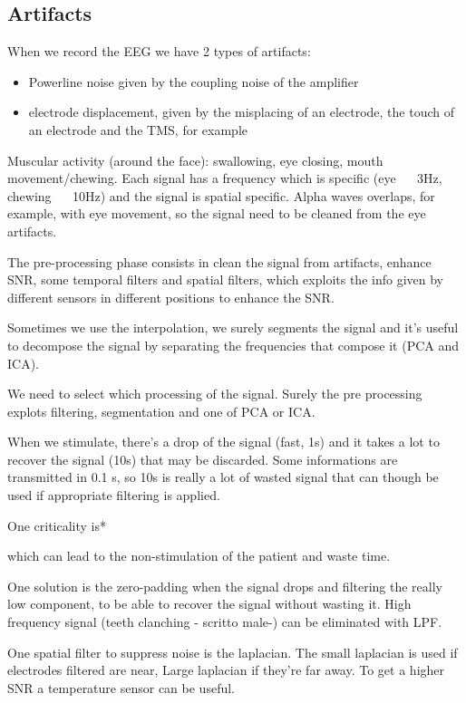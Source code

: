  \subsection{Artifacts}
 When we record the EEG we have 2 types of artifacts:
 \begin{itemize}
   \item Powerline noise given by the coupling noise of the amplifier
   \item electrode displacement, given by the misplacing of an electrode, the touch of an electrode and the TMS, for example
 \end{itemize}
 Muscular activity (around the face): swallowing, eye closing, mouth movement/chewing. Each signal has a frequency which is specific (eye ~~ 3Hz, chewing ~~ 10Hz) and the signal is spatial specific. Alpha waves overlaps, for example, with eye movement, so the signal need to be cleaned from the eye artifacts.

 The pre-processing phase consists in clean the signal from artifacts, enhance SNR, some temporal filters and spatial filters, which exploits the info given by different sensors in different positions to enhance the SNR.

 Sometimes we use the interpolation, we surely segments the signal and it's useful to decompose the signal by separating the frequencies that compose it (PCA and ICA).

 We need to select which processing of the signal. Surely the pre processing explots filtering, segmentation and one of PCA or ICA.

 When we stimulate, there's a drop of the signal (fast, 1s) and it takes a lot to recover the signal (10s) that may be discarded. Some informations are transmitted in 0.1 s, so 10s is really a lot of wasted signal that can though be used if appropriate filtering is applied.

 One criticality is*

 which can lead to the non-stimulation of the patient and waste time.

 One solution is the zero-padding when the signal drops and filtering the really low component, to be able to recover the signal without wasting it.
 High frequency signal (teeth clanching - scritto male-) can be eliminated with LPF.

 One spatial filter to suppress noise is the laplacian. The small laplacian is used if electrodes filtered are near, Large laplacian if they're far away. To get a higher SNR a temperature sensor can be useful.

